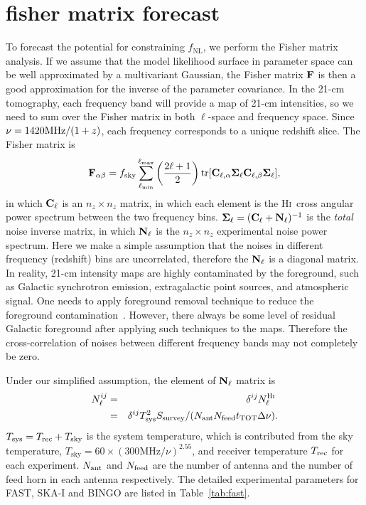 \documentclass[twocolumn,floatfix,nofootinbib,aps,reprint]{revtex4}
\def\hi{\textsc{Hi~}}
\begin{document}
\section{fisher matrix forecast}\label{sec:fisher}

To forecast the potential for constraining $f_\mathrm{NL}$, 
we perform the Fisher matrix analysis. If we assume that the 
model likelihood surface in parameter space can be well
approximated by a multivariant Gaussian, the Fisher matrix
$\bf{F}$ is then a good approximation for the inverse of the 
parameter covariance. In the 21-cm tomography, each frequency band will provide a map of 21-cm intensities,
so we need to sum over the Fisher matrix in both $\ell$-space and frequency space. Since $\nu=1420{\rm MHz}/(1+z)$, each frequency corresponds to a unique redshift slice. The Fisher matrix is
\begin{equation}
    {\bf F}_{\alpha\beta} = f_\mathrm{sky} 
    \sum^{\ell_\mathrm{max}}_{\ell_\mathrm{min}}
    \left(\frac{2\ell+1}{2}\right) \mathrm{tr}[{\bf C}_{\ell,\alpha} {\bf \Sigma}_\ell 
    {\bf C}_{\ell,\beta} {\bf \Sigma}_\ell],
\end{equation}
in which ${\bf C}_\ell$ is an $n_z \times n_z$ matrix, in which each element is
the \hi cross angular power spectrum between the two frequency bins. ${\bf \Sigma}_\ell = ({\bf C}_\ell + {\bf N}_\ell)^{-1}$ is the {\it total} noise
inverse matrix, in which
${\bf N}_\ell$ is the $n_{z} \times n_z$ experimental noise power spectrum. Here we make a simple assumption that
the noises in different frequency (redshift) bins are uncorrelated, therefore the ${\bf N}_\ell$ is a diagonal matrix. In reality, 21-cm intensity maps are highly contaminated by the foreground, such as Galactic synchrotron emission, extragalactic point sources, and atmospheric signal. One needs to apply foreground removal technique to reduce the foreground contamination~\cite{Zhang16,Bigot15,Olivari16}. However, there always be some level of residual Galactic foreground after applying such techniques to the maps. Therefore the cross-correlation of noises between different frequency bands may not completely be zero. 

Under our simplified assumption, the element of ${\bf N}_\ell$ matrix is
\begin{eqnarray}
    N_\ell^{ij} &=& \delta^{ij}N_\ell^\hi  \nonumber\\
                &=& \delta^{ij}T_\mathrm{sys}^2 
                S_\mathrm{survey}/
                (N_\mathrm{ant}N_\mathrm{feed}t_\mathrm{TOT}\Delta\nu).
\end{eqnarray}
$T_\mathrm{sys}=T_{\rm rec}+T_{\rm sky}$ is the system temperature, which is contributed from
the sky temperature,
$T_\mathrm{sky} = 60 \times (300\mathrm{MHz}/\nu)^{2.55}$, and 
receiver temperature $T_\mathrm{\rm rec}$ for each experiment. $N_{\rm ant}$ and $N_{\rm feed}$ are the number of antenna and the number of feed horn in each antenna respectively. The detailed experimental parameters
for FAST, SKA-I and BINGO are listed in Table~\ref{tab:fast}.
\end{document}
